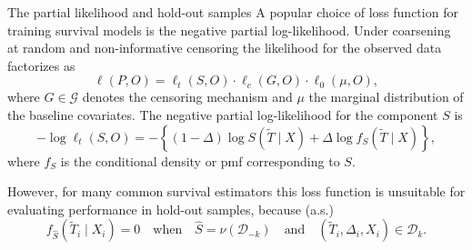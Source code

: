 \documentclass[smaller]{beamer}\usepackage{listings}
\newcommand{\est}{\ensuremath{\nu}}
\begin{document}
\begin{frame}[label={sec:org2de3626}]{The partial likelihood and hold-out samples}
A popular choice of loss function for training survival models is the negative partial
log-likelihood. Under coarsening at random and non-informative censoring the likelihood for the
observed data factorizes as
\begin{equation*}
  \ell(P, O) = \ell_t(S, O) \cdot \ell_c(G, O) \cdot \ell_0(\mu, O),
\end{equation*}
where \(G \in \mathcal{G} \) denotes the censoring mechanism and $\mu$ the marginal distribution of
the baseline covariates. The negative partial log-likelihood for the component \(S\) is
\begin{equation*}
  - \log \ell_t(S, O)
  = -
  \left\{
    (1-\Delta) \log S(\tilde T \mid X)
    + \Delta \log f_S(\tilde T \mid X)
  \right\},
\end{equation*}
where \(f_S\) is the conditional density or pmf corresponding to \(S\). \vfill

However, for many common survival estimators this loss function is unsuitable for evaluating
performance in hold-out samples, because (a.s.)
\begin{equation*}
  f_{\hat S}(\tilde T_i \mid X_i) = 0
  \quad \text{when} \quad
  \hat S =\est(\mathcal{D}_{-k})
  \quad \text{and} \quad
  (\tilde T_i, \Delta_i, X_i) \in \mathcal{D}_k.
\end{equation*}
\end{frame}
\end{document}

